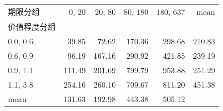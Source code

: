 \begin{tabular}{lrrrrr}
\toprule
期限分组 &  0, 20 &  20, 80 &  80, 180 &  180, 637 &   mean \\
价值程度分组 &          &           &            &             &        \\
\midrule
0.0, 0.6    &    39.85 &     72.62 &     170.36 &      298.68 & 210.83 \\
0.6, 0.9    &    96.19 &    167.16 &     290.92 &      421.85 & 239.19 \\
0.9, 1.1    &   111.49 &    201.69 &     799.79 &      953.88 & 251.29 \\
1.1, 3.8    &   254.16 &    260.10 &     709.67 &      811.20 & 451.38 \\
mean          &   131.63 &    192.98 &     443.38 &      505.12 &        \\
\bottomrule
\end{tabular}
